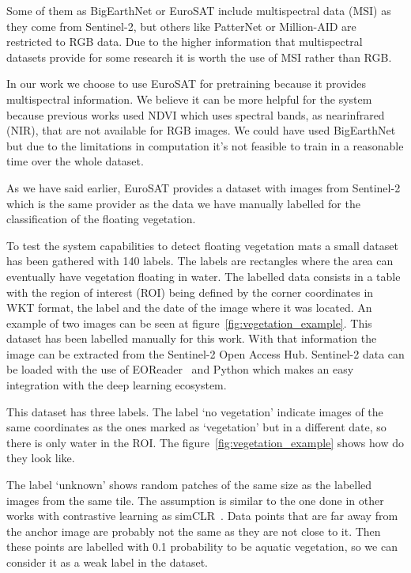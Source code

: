 \documentclass[conference]{IEEEtran}
\begin{document}
    Some of them as BigEarthNet or EuroSAT include multispectral data (MSI) as they come from Sentinel-2, but others like PatterNet or Million-AID are restricted to RGB data.
    Due to the higher information that multispectral datasets provide for some research it is worth the use of MSI rather than RGB\@.

    In our work we choose to use EuroSAT for pretraining because it provides multispectral information.
    We believe it can be more helpful for the system because previous works used NDVI which uses spectral bands, as nearinfrared (NIR), that are not available for RGB images.
    We could have used BigEarthNet but due to the limitations in computation it's not feasible to train in a reasonable time over the whole dataset.

    As we have said earlier, EuroSAT provides a dataset with images from Sentinel-2 which is the same provider as the data
    we have manually labelled for the classification of the floating vegetation.

    To test the system capabilities to detect floating vegetation mats a small dataset has been gathered with 140 labels.
    The labels are rectangles where the area can eventually have vegetation floating in water.
    The labelled data consists in a table with the region of interest (ROI) being defined by the corner coordinates in WKT format, the label and the date
    of the image where it was located.
    An example of two images can be seen at figure~\ref{fig:vegetation_example}.
    This dataset has been labelled manually for this work.
    With that information the image can be extracted from the Sentinel-2 Open Access Hub.
    Sentinel-2 data can be loaded with the use of EOReader~\cite{eoreader_paper} and Python which makes an easy integration with the deep learning ecosystem.

    This dataset has three labels.
    The label `no vegetation' indicate images of the same coordinates as the ones marked as `vegetation' but in a different date, so there is only water in the ROI\@.
    The figure~\ref{fig:vegetation_example} shows how do they look like.

    The label `unknown' shows random patches of the same size as the labelled images from the same tile.
    The assumption is similar to the one done in other works with contrastive learning as simCLR~\cite{chen2020simple, jean2019tile2vec}.
    Data points that are far away from the anchor image are probably not the same as they are not close to it.
    Then these points are labelled with 0.1 probability to be aquatic vegetation, so we can consider it as a weak label in the dataset.
\end{document}
